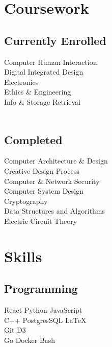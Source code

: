 \documentclass[letterpaper]{deedy-resume} %
\begin{document}
\begin{minipage}[t]{0.33\textwidth}
\section{Coursework} 
\subsection{Currently Enrolled}

Computer Human Interaction \\
Digital Integrated Design \\
Electronics \\ 
Ethics \& Engineering \\
Info \& Storage Retrieval \\ \ \\

\subsection{Completed}
Computer Architecture \& Design \\
Creative Design Process \\
Computer \& Network Security \\
Computer System Design \\
Cryptography \\
Data Structures and Algorithms \\
Electric Circuit Theory \\

\sectionspace %


\section{Skills}

\subsection{Programming}

\textbullet{} React \textbullet{} Python \textbullet{} JavaScript \\
\textbullet{} C++ \textbullet{} PostgresSQL \textbullet{} \LaTeX\ \\
\textbullet{} Git \textbullet{} D3 \\
\textbullet{} Go  \textbullet{} Docker \textbullet{} Bash


\end{minipage}
\end{document}
